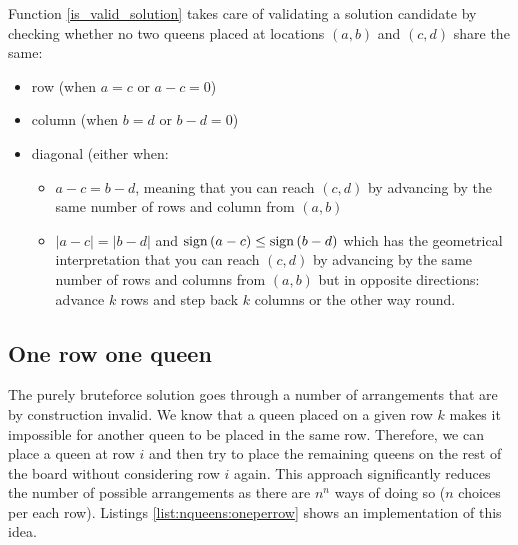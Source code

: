 Function \ref{is_valid_solution} takes care of validating a solution candidate by checking whether
no two queens placed at locations $(a,b)$ and $(c,d)$ share the same:
\begin{itemize}
	\item row (when $a = c$  or $a-c=0$)
	\item column (when $b = d$  or $b-d=0$) 
	\item diagonal (either when:
	\begin{itemize}
		\item $a-c = b-d$, meaning that you can reach $(c,d)$ by advancing by the same number of
		rows and column from $(a,b)$ 
		\item $|a-c| = |b-d|$ and $\operatorname{sign}{(a-c)} \leq \operatorname{sign}{(b-d)}$  which has the geometrical
		interpretation that you can  reach $(c,d)$ by advancing by the same number of rows and columns
		from $(a,b)$ but in opposite directions: advance $k$ rows and step back $k$ columns or the
		other way round.
	\end{itemize} 
\end{itemize}



\subsection{One row one queen}
\label{nqueens:sec:onerowonequeen}
The purely bruteforce solution goes through a number of arrangements that are by construction invalid. 
We know that a queen placed on a given row $k$ makes it impossible for another queen to
be placed in the same row. 
Therefore, we can place a queen at row $i$ and then try to place the remaining queens on the rest of the board without considering row $i$ again. 
This approach significantly reduces the number of possible arrangements as there are $n^n$ ways of doing so ($n$ choices per each row).
Listings \ref{list:nqueens:oneperrow} shows an implementation of this idea.




